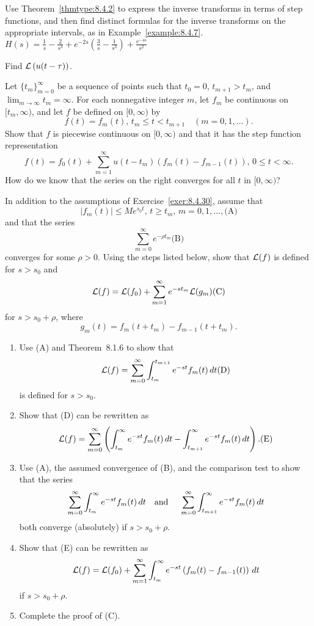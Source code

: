 \documentclass{ximera}
\begin{document}
\begin{problem}\label{exer:8.4.28}
Use Theorem~\ref{thmtype:8.4.2} to express the inverse transforms in terms of step functions, and then find distinct formulas for the inverse transforms on the appropriate intervals, as in
Example~\ref{example:8.4.7}.
$H(s)=\frac{1}{s}-\frac{2}{s^3}+e^{-2s}\left(\frac{3}{s}-\frac{1}{s^3}\right) +\frac{e^{-4s}}{s^2}$
\end{problem}

\begin{problem}\label{exer:8.4.29} Find ${\cal L}\left(u(t-\tau)\right)$.
\end{problem}

\begin{problem}\label{exer:8.4.30}
Let $\{t_m\}_{m=0}^\infty$ be a sequence of points such that $t_0=0$,
$t_{m+1}>t_m$, and $\lim_{m\to\infty}t_m=\infty$. For each nonnegative
integer $m$, let $f_m$ be continuous on $[t_m,\infty)$, and let $f$ be
defined on $[0,\infty)$ by
$$
f(t)=f_m(t),\,t_m\le t<t_{m+1}\quad (m=0,1,\dots).
$$
Show that $f$ is piecewise continuous on $[0,\infty)$  and
that it has the step function representation
$$
f(t)=f_0(t)+\sum_{m=1}^\infty u(t-t_m)\left(f_m(t)-f_{m-1}(t)\right),\,
0\le t<\infty.
$$
How do we know that the series on the right converges for all $t$
in $[0,\infty)$?
\end{problem}

\begin{problem}\label{exer:8.4.31}
In addition to the assumptions of Exercise~\ref{exer:8.4.30},
assume that
$$
|f_m(t)|\le Me^{s_0t},\,t\ge t_m,\,m=0,1,\dots,
\text{(A)}
$$
and that the series
$$
\sum_{m=0}^\infty e^{-\rho t_m}
\text{(B)}
$$
converges for some $\rho>0$. Using the  steps listed below, show
that
${\cal L}(f)$ is defined for $s>s_0$  and
$$
{\cal L}(f)={\cal L}(f_0)+\sum_{m=1}^\infty e^{-st_m}{\cal L}(g_m)
\text{(C)}
$$
for $s>s_0+\rho$,
where
$$
g_m(t)=f_m(t+t_m)-f_{m-1}(t+t_m).
$$

\begin{enumerate} %
\item
Use (A) and Theorem~8.1.6 to show that
$$
{\cal L}(f)=\sum_{m=0}^\infty\int_{t_m}^{t_{m+1}}e^{-st}f_m(t)\,dt
\text{(D)}
$$
is defined for $s>s_0$.
\item %
Show that  (D) can be rewritten as
$$
{\cal L}(f)=\sum_{m=0}^\infty\left(\int_{t_m}^\infty e^{-st}f_m(t)\,dt
-\int_{t_{m+1}}^\infty e^{-st}f_m(t)\,dt\right).
\text{(E)}
$$
\item %
Use  (A), the assumed convergence of  (B), and the
comparison test  to show that the series
$$
\sum_{m=0}^\infty\int_{t_m}^\infty e^{-st}f_m(t)\,dt\mbox{\quad and \quad}
\sum_{m=0}^\infty\int_{t_{m+1}}^\infty e^{-st}f_m(t)\,dt
$$
both converge (absolutely) if $s>s_0+\rho$.
\item %
Show that  (E) can be rewritten as
 $$
{\cal L}(f)={\cal L}(f_0)+\sum_{m=1}^\infty\int_{t_m}^\infty e^{-st}
\left(f_m(t)-f_{m-1}(t)\right)\,dt
$$
if $s>s_0+\rho$.
\item %
Complete the proof of  (C).
\end{enumerate}
\end{problem}
\end{document}
